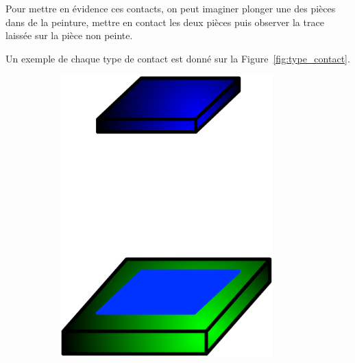 \documentclass[10pt,fleqn,draft]{article} %
\begin{document}
\begin{remark}
  Pour mettre en évidence ces contacts, on peut imaginer plonger une des pièces dans de la peinture, mettre en contact les deux pièces puis observer la trace laissée sur la pièce non peinte.
\end{remark}

Un exemple de chaque type de contact est donné sur la Figure~\ref{fig:type_contact}.

\begin{figure}[h]
  \begin{subfigure}[b]{0.3\textwidth}
    \centering
    \includegraphics[width=0.9\textwidth,height=.2\textheight,keepaspectratio]{images/plan-plan}
    \caption{}
  \end{subfigure}\hfill
  \begin{subfigure}[b]{0.3\textwidth}
    \centering

\end{subfigure}
\end{figure}
\end{document}
